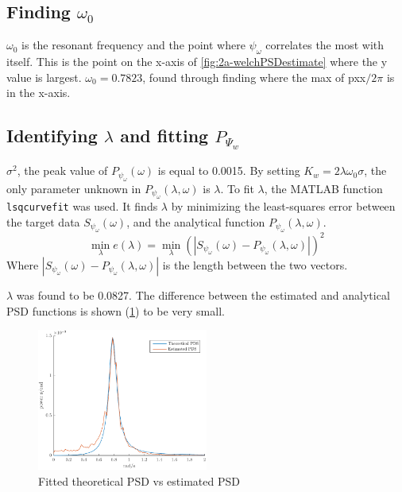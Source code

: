 \subsection{Finding $\omega_0$}
$\omega_0$ is the resonant 
frequency and the point where $\psi_\omega$ correlates the most with itself.  This is the point on the x-axis of \cref{fig:2a-welchPSDestimate} where the y value is largest.
$\omega_0 = 0.7823$, found through finding where the max of pxx$/2\pi$ is in the x-axis. 

\subsection{Identifying $\lambda$ and fitting $P_{\Psi_{w}}$}
$\sigma^2$, the peak value of $P_{\psi_\omega}(\omega)$ is equal to 0.0015.
By setting $K_w = 2\lambda\omega_0\sigma$, the only parameter unknown in $P_{\psi_\omega}(\lambda, \omega)$ is $\lambda$. To fit $\lambda$, the MATLAB function \texttt{lsqcurvefit} was used. It finds $\lambda$ by minimizing the least-squares error
between the target data $S_{\psi_\omega}(\omega)$, and the analytical function $P_{\psi_\omega}(\lambda, \omega)$.
\begin{equation*}
\min_{\lambda}e(\lambda) = \min_{\lambda}(|S_{\psi_\omega}(\omega) - P_{\psi_\omega}(\lambda, \omega)|)^2
\end{equation*}
Where $|S_{\psi_\omega}(\omega) - P_{\psi_\omega}(\lambda, \omega)|$ is the length between the two vectors.

$\lambda$ was found to be 0.0827. The difference between the estimated and analytical PSD functions is shown (\cref{fig:2d-fitted_theoretical_PSD_vs_estimated_PSD}) to be very small.

\begin{figure}[ht]
    \centering
    \includegraphics[width=0.5\textwidth]{images/2d-fitted_theoretical_PSD_vs_estimated_PSD}
    \caption{Fitted theoretical PSD vs estimated PSD}
    \label{fig:2d-fitted_theoretical_PSD_vs_estimated_PSD}
\end{figure}
